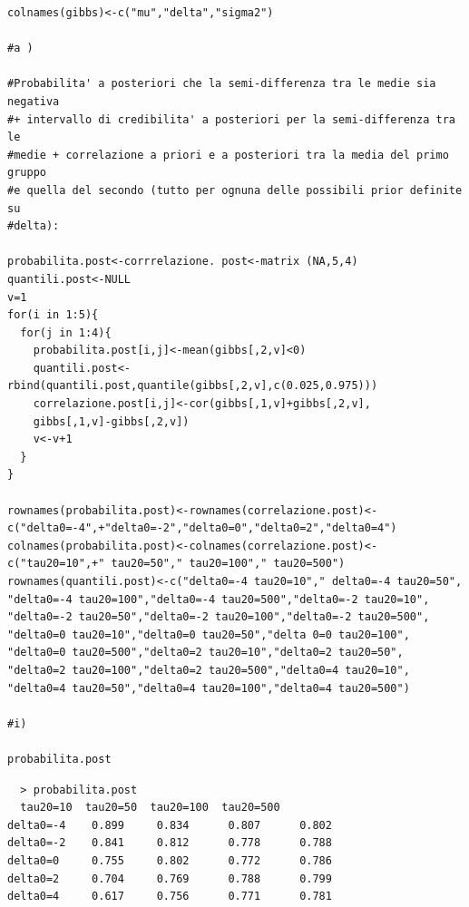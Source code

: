 \begin{itemize}
\begin{lstlisting}[style=R]
colnames(gibbs)<-c("mu","delta","sigma2")

#a )

#Probabilita' a posteriori che la semi-differenza tra le medie sia negativa
#+ intervallo di credibilita' a posteriori per la semi-differenza tra le
#medie + correlazione a priori e a posteriori tra la media del primo gruppo
#e quella del secondo (tutto per ognuna delle possibili prior definite su
#delta):

probabilita.post<-corrrelazione. post<-matrix (NA,5,4)
quantili.post<-NULL
v=1
for(i in 1:5){
  for(j in 1:4){
    probabilita.post[i,j]<-mean(gibbs[,2,v]<0)
    quantili.post<-rbind(quantili.post,quantile(gibbs[,2,v],c(0.025,0.975)))
    correlazione.post[i,j]<-cor(gibbs[,1,v]+gibbs[,2,v],
    gibbs[,1,v]-gibbs[,2,v])
    v<-v+1
  }
}

rownames(probabilita.post)<-rownames(correlazione.post)<-
c("delta0=-4",+"delta0=-2","delta0=0","delta0=2","delta0=4")
colnames(probabilita.post)<-colnames(correlazione.post)<-
c("tau20=10",+" tau20=50"," tau20=100"," tau20=500")
rownames(quantili.post)<-c("delta0=-4 tau20=10"," delta0=-4 tau20=50",
"delta0=-4 tau20=100","delta0=-4 tau20=500","delta0=-2 tau20=10",
"delta0=-2 tau20=50","delta0=-2 tau20=100","delta0=-2 tau20=500",
"delta0=0 tau20=10","delta0=0 tau20=50","delta 0=0 tau20=100",
"delta0=0 tau20=500","delta0=2 tau20=10","delta0=2 tau20=50",
"delta0=2 tau20=100","delta0=2 tau20=500","delta0=4 tau20=10",
"delta0=4 tau20=50","delta0=4 tau20=100","delta0=4 tau20=500")

#i)

probabilita.post
\end{lstlisting}

{
\color{red}
\begin{Verbatim}
  > probabilita.post
  tau20=10  tau20=50  tau20=100  tau20=500
delta0=-4    0.899     0.834      0.807      0.802
delta0=-2    0.841     0.812      0.778      0.788
delta0=0     0.755     0.802      0.772      0.786
delta0=2     0.704     0.769      0.788      0.799
delta0=4     0.617     0.756      0.771      0.781
\end{Verbatim}
}


\end{itemize}
